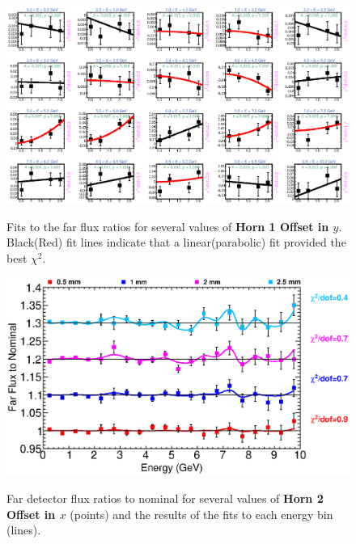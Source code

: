 \begin{figure}[ht]
  \begin{center}
    {\includegraphics[width=5.0in]{figures/Horn1YOffset_far_fits.eps}}
  \end{center}
\caption{ Fits to the far flux ratios for several values of {\bf Horn 1 Offset in $y$}. Black(Red) fit lines indicate that a linear(parabolic) fit provided the best $\chi^2$. }
\end{figure}

\begin{figure}[ht]
  \begin{center}
    {\includegraphics[width=6.0in]{figures/Horn2XOffset_far_summary.eps}}
  \end{center}
\caption{ Far detector flux ratios to nominal for several values of {\bf Horn 2 Offset in $x$} (points) and the results of the fits to each energy bin (lines).}
\end{figure}

